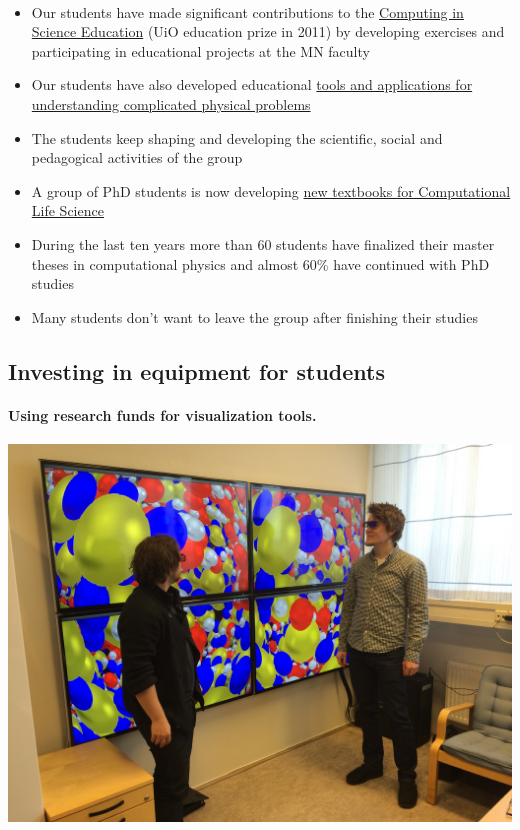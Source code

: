 \documentclass[%
twoside,                 %
final,                   %
10pt]{article}
\begin{document}
\paragraph{}
\begin{itemize}
\item Our students have made significant contributions to  the \href{{http://www.mn.uio.no/english/about/collaboration/cse/}}{Computing in Science Education}  (UiO education prize in 2011) by developing exercises and participating in educational projects at the MN faculty

\item Our students have also developed educational \href{{http://www.mn.uio.no/fysikk/om/aktuelt/aktuelle-saker/2015/realfagsapper.html}}{tools and applications for understanding complicated physical problems} 

\item The students keep shaping and developing the scientific, social and pedagogical activities of the group

\item A group of PhD students is now developing \href{{https://github.com/CINPLA/ibvcse}}{new textbooks for Computational Life Science}

\item During the last ten years more than 60 students have finalized their master theses in computational physics and  almost 60\% have continued with PhD studies

\item Many students don't want to leave the group after finishing their studies
\end{itemize}

\noindent






\subsection*{Investing in equipment for students}

\paragraph{Using research funds for visualization tools.}


\centerline{\includegraphics[width=0.7\linewidth]{fig-future/visualize.jpg}}
\end{document}
